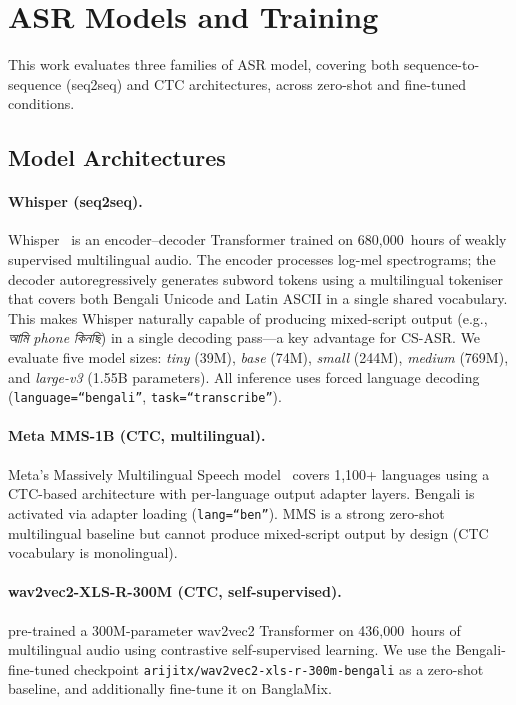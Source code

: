\section{ASR Models and Training}
\label{sec:method}

This work evaluates three families of ASR model, covering both
sequence-to-sequence (seq2seq) and CTC architectures, across zero-shot and
fine-tuned conditions.

\subsection{Model Architectures}

\paragraph{Whisper (seq2seq).}
Whisper~\citep{radford2023whisper} is an encoder--decoder Transformer trained
on 680,000~hours of weakly supervised multilingual audio.
The encoder processes log-mel spectrograms; the decoder autoregressively
generates subword tokens using a multilingual tokeniser that covers both
Bengali Unicode and Latin ASCII in a single shared vocabulary.
This makes Whisper naturally capable of producing mixed-script output (e.g.,
\textit{আমি phone কিনছি}) in a single decoding pass---a key advantage for
CS-ASR.
We evaluate five model sizes: \textit{tiny} (39M), \textit{base} (74M),
\textit{small} (244M), \textit{medium} (769M), and \textit{large-v3} (1.55B
parameters).
All inference uses forced language decoding (\texttt{language=``bengali''},
\texttt{task=``transcribe''}).

\paragraph{Meta MMS-1B (CTC, multilingual).}
Meta's Massively Multilingual Speech model~\citep{pratap2024mms} covers
1,100+ languages using a CTC-based architecture with per-language output
adapter layers.
Bengali is activated via adapter loading (\texttt{lang=``ben''}).
MMS is a strong zero-shot multilingual baseline but cannot produce mixed-script
output by design (CTC vocabulary is monolingual).

\paragraph{wav2vec2-XLS-R-300M (CTC, self-supervised).}
\citet{babu2022xlsr} pre-trained a 300M-parameter wav2vec2 Transformer on
436,000~hours of multilingual audio using contrastive self-supervised learning.
We use the Bengali-fine-tuned checkpoint \texttt{arijitx/wav2vec2-xls-r-300m-bengali}
as a zero-shot baseline, and additionally fine-tune it on BanglaMix.

